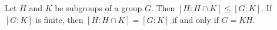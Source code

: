 \begin{proposition}
Let $H$ and $K$ be subgroups of a group $G$. Then $[H : H \cap K] \leq [G : K]$. If $[G : K]$ is finite, then $[H : H \cap K] = [G : K]$ if and only if $G = KH$.
\end{proposition}
